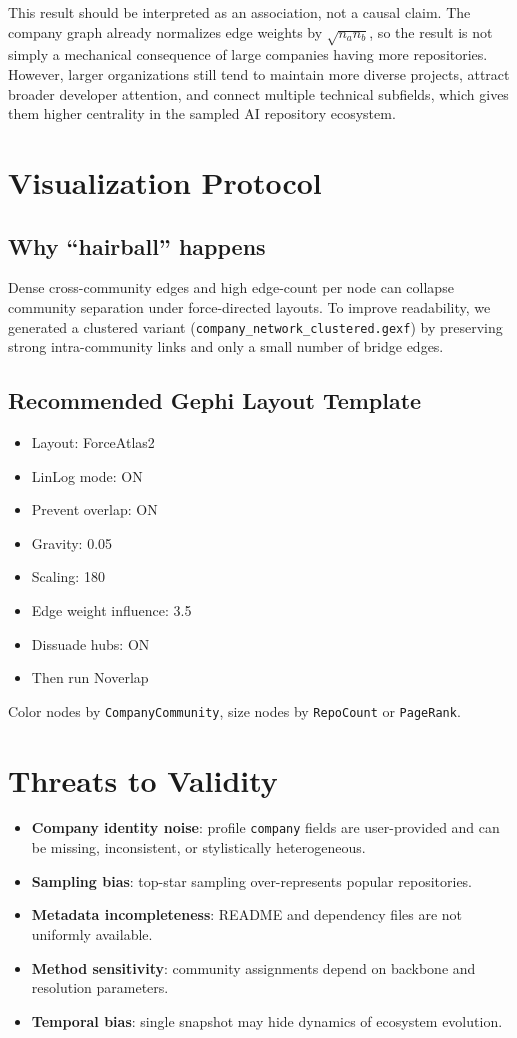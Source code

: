 \documentclass[11pt]{article}
\begin{document}
This result should be interpreted as an association, not a causal claim.
The company graph already normalizes edge weights by $\sqrt{n_a n_b}$, so the result is not simply a mechanical consequence of large companies having more repositories.
However, larger organizations still tend to maintain more diverse projects, attract broader developer attention, and connect multiple technical subfields, which gives them higher centrality in the sampled AI repository ecosystem.

\section{Visualization Protocol}
\subsection{Why ``hairball'' happens}
Dense cross-community edges and high edge-count per node can collapse community separation under force-directed layouts.
To improve readability, we generated a clustered variant (\texttt{company\_network\_clustered.gexf}) by preserving strong intra-community links and only a small number of bridge edges.

\subsection{Recommended Gephi Layout Template}
\begin{itemize}[leftmargin=1.5em]
    \item Layout: ForceAtlas2
    \item LinLog mode: ON
    \item Prevent overlap: ON
    \item Gravity: 0.05
    \item Scaling: 180
    \item Edge weight influence: 3.5
    \item Dissuade hubs: ON
    \item Then run Noverlap
\end{itemize}
Color nodes by \texttt{CompanyCommunity}, size nodes by \texttt{RepoCount} or \texttt{PageRank}.

\section{Threats to Validity}
\begin{itemize}[leftmargin=1.5em]
    \item \textbf{Company identity noise}: profile \texttt{company} fields are user-provided and can be missing, inconsistent, or stylistically heterogeneous.
    \item \textbf{Sampling bias}: top-star sampling over-represents popular repositories.
    \item \textbf{Metadata incompleteness}: README and dependency files are not uniformly available.
    \item \textbf{Method sensitivity}: community assignments depend on backbone and resolution parameters.
    \item \textbf{Temporal bias}: single snapshot may hide dynamics of ecosystem evolution.
\end{itemize}
\end{document}
